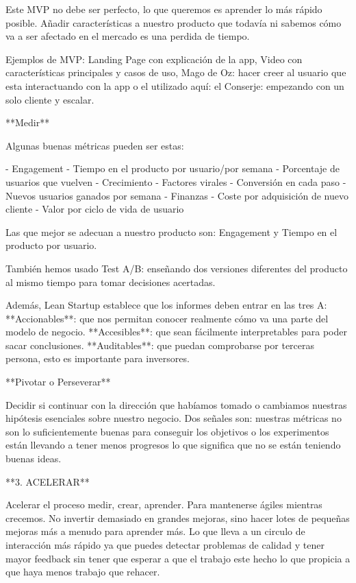 \documentclass[12pt,twoside,titlepage]{report}
\begin{document}
Este MVP no debe ser perfecto, lo que queremos es aprender lo más rápido posible. Añadir características a nuestro producto que todavía ni sabemos cómo va a ser afectado en el mercado es una perdida de tiempo.

Ejemplos de MVP: Landing Page con explicación de la app, Video con características principales y casos de uso, Mago de Oz: hacer creer al usuario que esta interactuando con la app o el utilizado aquí: el Conserje: empezando con un solo cliente y escalar.

**Medir**

Algunas buenas métricas pueden ser estas: 

- Engagement
- Tiempo en el producto por usuario/por semana
- Porcentaje de usuarios que vuelven
- Crecimiento
- Factores virales
- Conversión en cada paso
- Nuevos usuarios ganados por semana
- Finanzas
- Coste por adquisición de nuevo cliente
- Valor por ciclo de vida de usuario

Las que mejor se adecuan a nuestro producto son: Engagement y Tiempo en el producto por usuario.

También hemos usado Test A/B: enseñando dos versiones diferentes del producto al mismo tiempo para tomar decisiones acertadas.

Además, Lean Startup establece que los informes deben entrar en las tres A: **Accionables**: que nos permitan conocer realmente cómo va una parte del modelo de negocio. **Accesibles**: que sean fácilmente interpretables para poder sacar conclusiones. **Auditables**: que puedan comprobarse por terceras persona, esto es importante para inversores.

**Pivotar o Perseverar**

Decidir si continuar con la dirección que habíamos tomado o cambiamos nuestras hipótesis esenciales sobre nuestro negocio. Dos señales son: nuestras métricas no son lo suficientemente buenas para conseguir los objetivos o los experimentos están llevando a tener menos progresos lo que significa que no se están teniendo buenas ideas.

**3. ACELERAR**

Acelerar el proceso medir, crear, aprender. Para mantenerse ágiles mientras crecemos. No invertir demasiado en grandes mejoras, sino hacer lotes de pequeñas mejoras más a menudo para aprender más. Lo que lleva a un circulo de interacción más rápido ya que puedes detectar problemas de calidad y tener mayor feedback sin tener que esperar a que el trabajo este hecho lo que propicia a que haya menos trabajo que rehacer.
\end{document}
